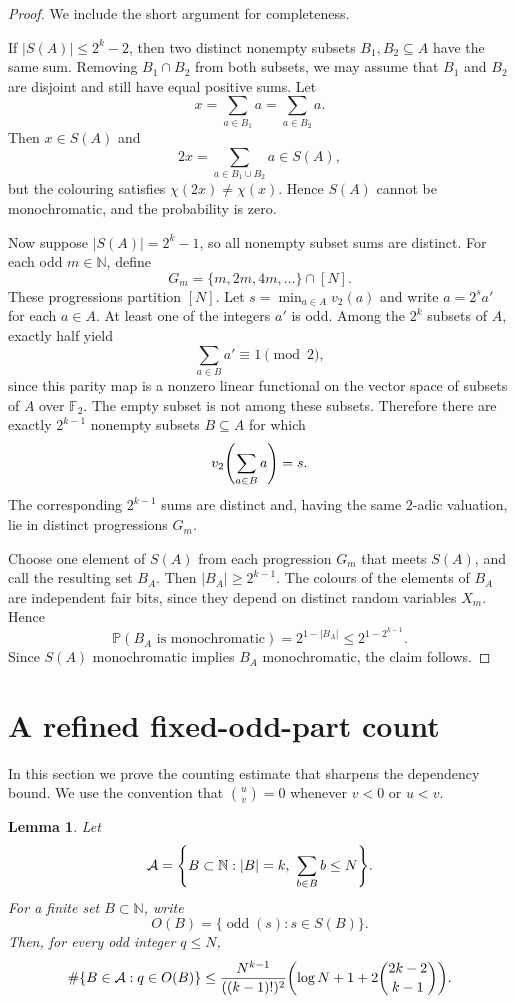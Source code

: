 \documentclass[12pt,a4paper,english,reqno]{amsart}
\theoremstyle{plain}
\newtheorem{lemma}[theorem]{Lemma}
\theoremstyle{remark}
\DeclareMathOperator{\odd}{odd}
\newcommand{\A}{\mathcal{A}}
\newcommand{\N}{\mathbb{N}}
\let\originalleft\left
\let\originalright\right
\renewcommand{\left}{\mathopen{}\mathclose\bgroup\originalleft}
\renewcommand{\right}{\aftergroup\egroup\originalright}
\begin{document}
\begin{proof}
We include the short argument for completeness.

If $|S(A)|\le 2^k-2$, then two distinct nonempty subsets $B_1,B_2\subseteq A$ have the same sum. Removing $B_1\cap B_2$ from both subsets, we may assume that $B_1$ and $B_2$ are disjoint and still have equal positive sums. Let
\[
x=\sum_{a\in B_1}a=\sum_{a\in B_2}a.
\]
Then $x\in S(A)$ and
\[
2x=\sum_{a\in B_1\cup B_2}a\in S(A),
\]
but the colouring satisfies $\chi(2x)\ne \chi(x)$. Hence $S(A)$ cannot be monochromatic, and the probability is zero.

Now suppose $|S(A)|=2^k-1$, so all nonempty subset sums are distinct. For each odd $m\in\N$, define
\[
G_m=\{m,2m,4m,\dots\}\cap [N].
\]
These progressions partition $[N]$. Let $s=\min_{a\in A}v_2(a)$ and write $a=2^s a'$ for each $a\in A$. At least one of the integers $a'$ is odd. Among the $2^k$ subsets of $A$, exactly half yield
\[
\sum_{a\in B}a'\equiv 1\pmod 2,
\]
since this parity map is a nonzero linear functional on the vector space of subsets of $A$ over $\mathbb F_2$. The empty subset is not among these subsets. Therefore there are exactly $2^{k-1}$ nonempty subsets $B\subseteq A$ for which
\[
v_2\left(\sum_{a\in B}a\right)=s.
\]
The corresponding $2^{k-1}$ sums are distinct and, having the same $2$-adic valuation, lie in distinct progressions $G_m$.

Choose one element of $S(A)$ from each progression $G_m$ that meets $S(A)$, and call the resulting set $B_A$. Then $|B_A|\ge 2^{k-1}$. The colours of the elements of $B_A$ are independent fair bits, since they depend on distinct random variables $X_m$. Hence
\[
\mathbb P(B_A\text{ is monochromatic})=2^{1-|B_A|}\le 2^{1-2^{k-1}}.
\]
Since $S(A)$ monochromatic implies $B_A$ monochromatic, the claim follows.
\end{proof}

\section{A refined fixed-odd-part count}\label{counting}

In this section we prove the counting estimate that sharpens the dependency bound. We use the convention that $\binom{u}{v}=0$ whenever $v<0$ or $u<v$.

\begin{lemma}\label{fixedqlemma}
Let
\[
\A=\left\{B\subset\N: |B|=k,\ \sum_{b\in B}b\le N\right\}.
\]
For a finite set $B\subset\N$, write
\[
O(B)=\{\odd(s):s\in S(B)\}.
\]
Then, for every odd integer $q\le N$,
\begin{equation}\label{fixedqbound}
\#\{B\in\A:q\in O(B)\}
\le
\frac{N^{k-1}}{((k-1)!)^2}
\left(\log N+1+2\binom{2k-2}{k-1}\right).
\end{equation}
\end{lemma}
\end{document}
